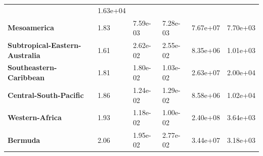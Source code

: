 \begin{table}[H]
{\begin{tabular}{llllll}
                                                                & 1.63e+04
            \\
            \textbf{Mesoamerica}                                & 1.83
                                                                & 7.59e-03
                                                                & 7.28e-03
                                                                & 7.67e+07
                                                                & 7.70e+03
            \\
            \textbf{Subtropical-Eastern-Australia}              & 1.61
                                                                & 2.62e-02
                                                                &
            2.55e-02                                            & 8.35e+06
                                                                & 1.01e+03
            \\
            \textbf{Southeastern-Caribbean}                     & 1.81
                                                                & 1.80e-02
                                                                & 1.03e-02
                                                                & 2.63e+07
                                                                & 2.00e+04
            \\
            \textbf{Central-South-Pacific}                      & 1.86
                                                                & 1.24e-02
                                                                & 1.29e-02
                                                                & 8.58e+06
                                                                & 1.02e+04
            \\
            \textbf{Western-Africa}                             & 1.93
                                                                & 1.18e-02
                                                                & 1.00e-02
                                                                & 2.40e+08
                                                                & 3.64e+03
            \\
            \textbf{Bermuda}                                    & 2.06
                                                                & 1.95e-02
                                                                & 2.77e-02
                                                                & 3.44e+07
                                                                & 3.18e+03

\end{tabular}}
\end{table}
